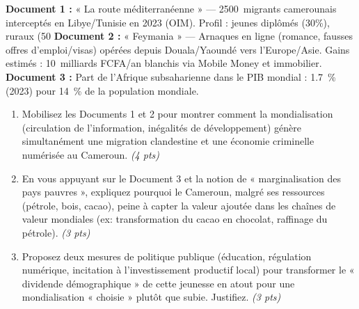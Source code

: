 \documentclass[11pt]{article}
\begin{document}
\begin{exercice}
\textbf{Document 1 :} « La route méditerranéenne » — \SI{2500}{migrants} camerounais interceptés en Libye/Tunisie en 2023 (OIM). Profil : jeunes diplômés (30\%), ruraux (50%
\textbf{Document 2 :} « Feymania » — Arnaques en ligne (romance, fausses offres d'emploi/visas) opérées depuis Douala/Yaoundé vers l'Europe/Asie. Gains estimés : \SI{10}{milliards} FCFA/an blanchis via Mobile Money et immobilier.
\textbf{Document 3 :} Part de l'Afrique subsaharienne dans le PIB mondial : \SI{1,7}{\%} (2023) pour \SI{14}{\%} de la population mondiale.

\begin{enumerate}
\item Mobilisez les Documents 1 et 2 pour montrer comment la mondialisation (circulation de l'information, inégalités de développement) génère simultanément une migration clandestine et une économie criminelle numérisée au Cameroun. \textit{(4 pts)}
\item En vous appuyant sur le Document 3 et la notion de « marginalisation des pays pauvres », expliquez pourquoi le Cameroun, malgré ses ressources (pétrole, bois, cacao), peine à capter la valeur ajoutée dans les chaînes de valeur mondiales (ex: transformation du cacao en chocolat, raffinage du pétrole). \textit{(3 pts)}
\item Proposez deux mesures de politique publique (éducation, régulation numérique, incitation à l'investissement productif local) pour transformer le « dividende démographique » de cette jeunesse en atout pour une mondialisation « choisie » plutôt que subie. Justifiez. \textit{(3 pts)}
\end{enumerate}
\end{exercice}
\end{document}
